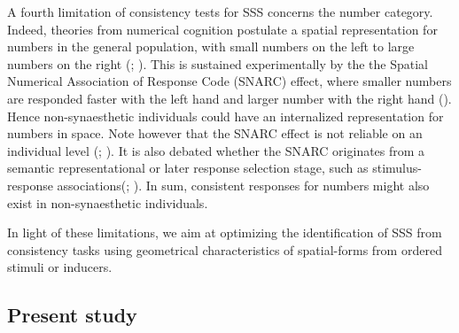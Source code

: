 \documentclass[
  man,
  floatsintext,
  longtable,
  a4paper,
  nolmodern,
  notxfonts,
  notimes,
  colorlinks=true,linkcolor=blue,citecolor=blue,urlcolor=blue]{apa7}
\begin{document}
A fourth limitation of consistency tests for SSS concerns the number
category. Indeed, theories from numerical cognition postulate a spatial
representation for numbers in the general population, with small numbers
on the left to large numbers on the right
(;
). This is sustained
experimentally by the the Spatial Numerical Association of Response Code
(SNARC) effect, where smaller numbers are responded faster with the left
hand and larger number with the right hand
(). Hence
non-synaesthetic individuals could have an internalized representation
for numbers in space. Note however that the SNARC effect is not reliable
on an individual level (;
). It is also debated
whether the SNARC originates from a semantic representational or later
response selection stage, such as stimulus-response
associations(;
).
In sum, consistent responses for numbers might also exist in
non-synaesthetic individuals.

In light of these limitations, we aim at optimizing the identification
of SSS from consistency tasks using geometrical characteristics of
spatial-forms from ordered stimuli or inducers.


\subsection{Present study}\label{present-study}

\end{document}
